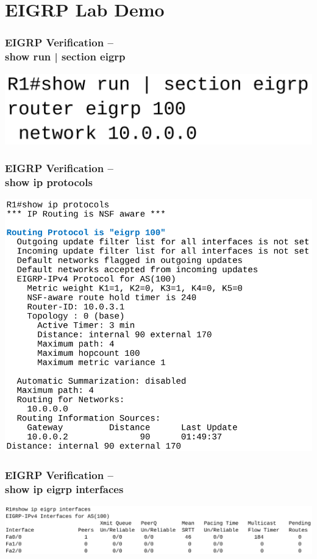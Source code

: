 \documentclass[pdflatex,compress,mathserif]{beamer}
\begin{document}
\section{EIGRP Lab Demo}

\begin{frame}
	\frametitle{EIGRP Verification –\\ show run | section eigrp}
	\begin{center}
		\includegraphics[width=0.6\linewidth]{img/img23}
	\end{center}
\end{frame}

\begin{frame}
	\frametitle{EIGRP Verification –\\ show ip protocols}
	\begin{center}
		\includegraphics[width=0.6\linewidth]{img/img24}
	\end{center}
\end{frame}

\begin{frame}
	\frametitle{EIGRP Verification –\\ show ip eigrp interfaces}
	\begin{center}
		\includegraphics[width=\linewidth]{img/img25}
	\end{center}
\end{frame}
\end{document}
